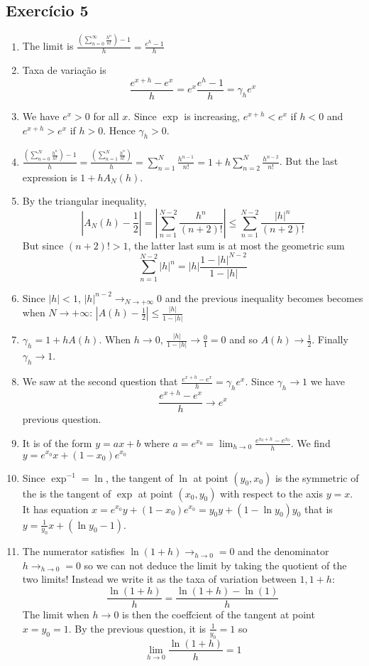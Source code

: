 \subsection*{Exercício 5}

\begin{enumerate}
\item The limit is
  $\frac{\left(\sum_{n=0}^\infty \frac{h^n}{n!}\right) - 1}{h} = \frac{e^h-1}{h}$
\item Taxa de variação is
  $$\frac{e^{x+h}-e^x}{h} = e^x \frac{e^h-1}{h} = \gamma_h e^x$$
\item
  We have $e^x > 0$ for all $x$.
  Since $\exp$ is increasing, $e^{x+h}<e^x$ if $h < 0$ and
  $e^{x+h}>e^x$ if $h > 0$. Hence $\gamma_h > 0$.
\item
  $\frac{\left(\sum_{n=0}^N \frac{h^n}{n!}\right) - 1}{h} =
  \frac{\left(\sum_{n=1}^N \frac{h^n}{n!}\right)}{h} =
  \sum_{n=1}^N \frac{h^{n-1}}{n!} = 1 + h \sum_{n=2}^N \frac{h^{n-2}}{n!}$.
  But the last expression is $1+hA_N(h)$.
\item By the triangular inequality,
  $$
  \left|A_N(h)-\frac{1}{2}\right| =
  \left|\sum_{n=1}^{N-2} \frac{h^{n}}{{(n+2)}!}\right|
  \leq
  \sum_{n=1}^{N-2} \frac{{|h|}^n}{{(n+2)}!}
  $$
  But since $(n+2)! > 1$, the latter last sum is at most the geometric sum
  $$\sum_{n=1}^{N-2} {|h|}^n = {|h|} \frac{1-{|h|}^{N-2}}{1-{|h|}}$$
\item
  Since $|h| < 1$, $|h|^{n-2} \rightarrow_{N\rightarrow+\infty} 0$ and the
  previous
  inequality becomes becomes when $N \rightarrow +\infty$:
  $\left|A(h)-\frac{1}{2}\right| \leq \frac{|h|}{1-{|h|}}$
\item $\gamma_h = 1 + h A(h)$. When $h \rightarrow 0$,
  $\frac{|h|}{1-{|h|}} \rightarrow \frac{0}{1} = 0$ and so
  $A(h) \rightarrow \frac{1}{2}$. Finally $\gamma_h \rightarrow 1$.
\item We saw at the second question that
  $\frac{e^{x+h}-e^x}{h} = \gamma_h e^x$.
  Since $\gamma_h \rightarrow 1$ we have
  $$\frac{e^{x+h}-e^x}{h} \rightarrow e^x$$
  previous question.
\item It is of the form $y = a x + b$ where
  $a = e^{x_0} = \lim_{h \rightarrow 0} \frac{e^{x_0+h}-e^{x_0}}{h}$.
  We find $y = e^{x_0} x + {(1-x_0)}e^{x_0}$
\item Since $\exp^{-1} = \ln$, the tangent of $\ln$ at point
  $(y_0,x_0)$ is the symmetric of the is the tangent of $\exp$ at point
  $(x_0,y_0)$ with respect to the axis $y=x$.
  It has equation
  $x = e^{x_0} y + {(1-x_0)}e^{x_0} = y_0 y + {(1 - \ln y_0)} y_0$
  that is $y = \frac{1}{y_0} x + {(\ln y_0 - 1)}$.

\item The numerator satisfies $\ln{(1+h)} \rightarrow_{h \rightarrow 0} = 0$
  and the denominator $h \rightarrow_{h \rightarrow 0} = 0$ so
  we can not deduce the limit by taking the quotient of the two limits!
  Instead we write it as the taxa of variation between $1, 1+h$:
  $$
  \frac{\ln{(1+h)}}{h} = \frac{\ln{(1+h)} - \ln(1)}{h}
  $$
  The limit when $h \rightarrow 0$ is then the coeffcient of the tangent
  at point $x = y_0 = 1$. By the previous question, it is
  $\frac{1}{y_0} = 1$ so
  $$
  \lim_{h \rightarrow 0} \frac{\ln{(1+h)}}{h} = 1
  $$
\end{enumerate}
